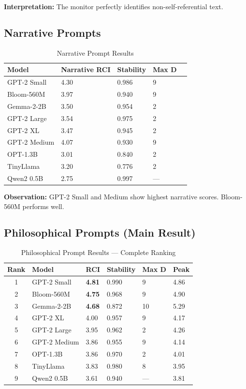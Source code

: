 \documentclass[12pt,a4paper]{article}
\begin{document}
\textbf{Interpretation:} The monitor perfectly identifies non-self-referential text.

\subsection{Narrative Prompts}

\begin{table}[h]
\centering
\caption{Narrative Prompt Results}
\begin{tabular}{lllll}
\toprule
\textbf{Model} & \textbf{Narrative RCI} & \textbf{Stability} & \textbf{Max D} \\
\midrule
GPT-2 Small & 4.30 & 0.986 & 9 \\
Bloom-560M & 3.97 & 0.940 & 9 \\
Gemma-2-2B & 3.50 & 0.954 & 2 \\
GPT-2 Large & 3.54 & 0.975 & 2 \\
GPT-2 XL & 3.47 & 0.945 & 2 \\
GPT-2 Medium & 4.07 & 0.930 & 9 \\
OPT-1.3B & 3.01 & 0.840 & 2 \\
TinyLlama & 3.20 & 0.776 & 2 \\
Qwen2 0.5B & 2.75 & 0.997 & --- \\
\bottomrule
\end{tabular}
\end{table}

\textbf{Observation:} GPT-2 Small and Medium show highest narrative scores. Bloom-560M performs well.

\subsection{Philosophical Prompts (Main Result)}

\begin{table}[h]
\centering
\caption{Philosophical Prompt Results — Complete Ranking}
\begin{tabular}{clllll}
\toprule
\textbf{Rank} & \textbf{Model} & \textbf{RCI} & \textbf{Stability} & \textbf{Max D} & \textbf{Peak} \\
\midrule
1 & GPT-2 Small & \textbf{4.81} & 0.990 & 9 & 4.86 \\
2 & Bloom-560M & \textbf{4.75} & 0.968 & 9 & 4.90 \\
3 & Gemma-2-2B & \textbf{4.68} & 0.872 & 10 & 5.29 \\
4 & GPT-2 XL & 4.00 & 0.957 & 9 & 4.17 \\
5 & GPT-2 Large & 3.95 & 0.962 & 2 & 4.26 \\
6 & GPT-2 Medium & 3.86 & 0.955 & 9 & 4.14 \\
7 & OPT-1.3B & 3.86 & 0.970 & 2 & 4.01 \\
8 & TinyLlama & 3.83 & 0.980 & 8 & 3.95 \\
9 & Qwen2 0.5B & 3.61 & 0.940 & --- & 3.81 \\
\bottomrule
\end{tabular}
\end{table}
\end{document}
